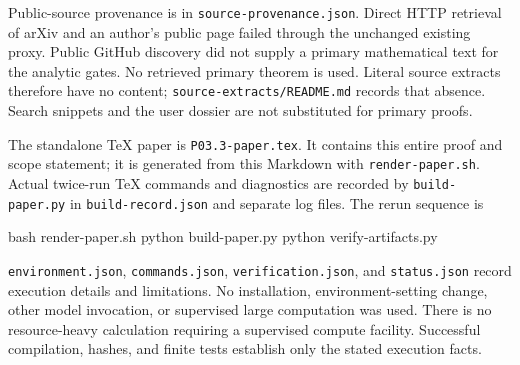 \documentclass[
  11pt,
]{article}
\newenvironment{Shaded}{}{}
\newcommand{\NormalTok}[1]{#1}
\begin{document}
Public-source provenance is in \texttt{source-provenance.json}. Direct
HTTP retrieval of arXiv and an author's public page failed through the
unchanged existing proxy. Public GitHub discovery did not supply a
primary mathematical text for the analytic gates. No retrieved primary
theorem is used. Literal source extracts therefore have no content;
\texttt{source-extracts/README.md} records that absence. Search snippets
and the user dossier are not substituted for primary proofs.

The standalone TeX paper is \texttt{P03.3-paper.tex}. It contains this
entire proof and scope statement; it is generated from this Markdown
with \texttt{render-paper.sh}. Actual twice-run TeX commands and
diagnostics are recorded by \texttt{build-paper.py} in
\texttt{build-record.json} and separate log files. The rerun sequence is

\begin{Shaded}
\begin{Highlighting}[]
\NormalTok{bash render{-}paper.sh}
\NormalTok{python build{-}paper.py}
\NormalTok{python verify{-}artifacts.py}
\end{Highlighting}
\end{Shaded}

\texttt{environment.json}, \texttt{commands.json},
\texttt{verification.json}, and \texttt{status.json} record execution
details and limitations. No installation, environment-setting change,
other model invocation, or supervised large computation was used. There
is no resource-heavy calculation requiring a supervised compute
facility. Successful compilation, hashes, and finite tests establish
only the stated execution facts.
\end{document}
